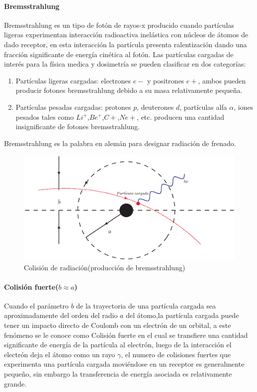 \paragraph{Bremsstrahlung}
Bremsstrahlung es un tipo de fotón de rayos-x producido cuando partículas ligeras experimentan interacción radioactiva inelástica con núcleos de átomos de dado receptor, en esta interacción la partícula presenta ralentización
 dando una fracción significante de energía cinética al fotón\cite{Frank}. Las partículas cargadas de interés para la física medica y dosimetría se pueden clasificar en dos categorías:
\begin{enumerate}
  \item Partículas ligeras cargadas: electrones $e-$ y positrones $e+$, ambos pueden producir fotones bremsstrahlung debido a su masa relativamente pequeña\cite{Podgorsak}.
  \item  Partículas pesadas cargadas: protones $p$, deuterones $d$, partículas alfa $\alpha$, iones pesados tales como $Li^+$,$Be^+$,$C+$,$Ne+$, etc. producen una cantidad insignificante de fotones bremsstrahlung\cite{Podgorsak}.
\end{enumerate}


Bremsstrahlung es la palabra en alemán para designar radiación de frenado.

\begin{figure}[htbp]
   \centering
   \includegraphics[width=.6\linewidth]{./Figures/radiacol.eps}
   \caption[Colisión de radiación]{Colisión de radiación(producción de bremsstrahlung)}
   \label{fig:B}
\end{figure}


\paragraph{Colisión fuerte($b\approx a$)}
Cuando el parámetro $b$ de la trayectoria de una partícula cargada sea aproximadamente del orden del radio $a$ del átomo,la partícula cargada puede tener un impacto directo de Coulomb con un electrón de un orbital, a este fenómeno se le conoce como Colisión fuerte en el cual se transfiere una cantidad significante de energía de la partícula al electrón, luego de la interacción el electrón deja el átomo como un rayo $\gamma$, el numero de colisiones fuertes que  experimenta  una partícula cargada moviéndose en un receptor es generalmente pequeño, sin embargo la transferencia de energía asociada es relativamente grande\cite{Podgorsak}.


